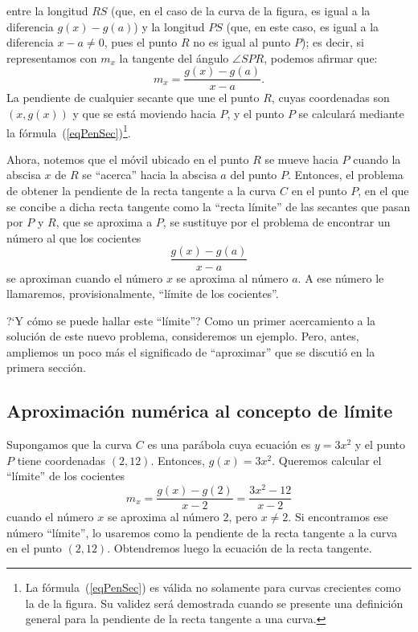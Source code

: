 entre la longitud $RS$ (que, en el caso de la curva de la figura, es igual a la diferencia $g(x) -
g(a)$) y la longitud $PS$ (que, en este caso, es igual a la diferencia $x - a \neq 0$, pues el
punto $R$ no es igual al punto $P$); es decir, si representamos con $m_x$ la tangente del ángulo
$\angle SPR$, podemos afirmar que:
\begin{equation}
\label{eqPenSec}%
m_x = \frac{g(x)-g(a)}{x-a}.
\end{equation}
La pendiente de cualquier secante que une el punto $R$, cuyas coordenadas son $(x,g(x))$ y que se
está moviendo hacia $P$, y el punto $P$ se calculará mediante la
fórmula~(\ref{eqPenSec})\footnote{La fórmula~(\ref{eqPenSec}) es válida no solamente para curvas
crecientes como la de la figura. Su validez será demostrada cuando se presente una definición
general para la pendiente de la recta tangente a una curva.}.

Ahora, notemos que el móvil ubicado en el punto $R$ se mueve hacia $P$ cuando la abscisa $x$ de $R$
se ``acerca'' hacia la abscisa $a$ del punto $P$. Entonces, el problema de obtener la pendiente de
la recta tangente a la curva $C$ en el punto $P$, en el que se concibe a dicha recta tangente como
la ``recta límite'' de las secantes que pasan por $P$ y $R$, que se aproxima a $P$, se sustituye
por el problema de encontrar un número al que los cocientes
\[
\frac{g(x)-g(a)}{x-a}
\]
se aproximan cuando el número $x$ se aproxima al número $a$. A ese número le llamaremos,
provisionalmente, ``límite de los cocientes''.

?`Y cómo se puede hallar este ``límite''? Como un primer acercamiento a la solución de este nuevo
problema, consideremos un ejemplo. Pero, antes, ampliemos un poco más el significado de
``aproximar'' que se discutió en la primera sección.

\subsection{Aproximación numérica al concepto de límite}
Supongamos que la curva $C$ es una parábola cuya ecuación es $y = 3x^2$ y el punto $P$ tiene
coordenadas $(2,12)$. Entonces, $g(x) = 3x^2$. Queremos calcular el ``límite'' de los cocientes
\[
m_x = \frac{g(x) - g(2)}{x - 2} = \frac{3x^2 - 12}{x - 2}
\]
cuando el número $x$ se aproxima al número $2$, pero $x\neq 2$. Si encontramos ese número
``límite'', lo usaremos como la pendiente de la recta tangente a la curva en el punto $(2,12)$.
Obtendremos luego la ecuación de la recta tangente.


